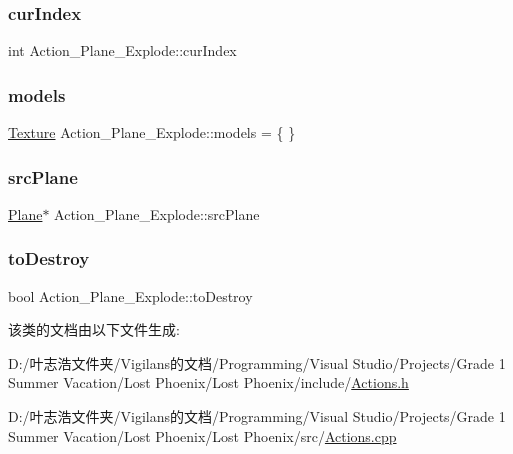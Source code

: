 \subsubsection{\texorpdfstring{cur\+Index}{curIndex}}
{\footnotesize\ttfamily int Action\+\_\+\+Plane\+\_\+\+Explode\+::cur\+Index}

\mbox{\label{class_action___plane___explode_ab37c2419e1e16a739b856de09df79909}} 
\subsubsection{\texorpdfstring{models}{models}}
{\footnotesize\ttfamily \hyperlink{struct_texture}{Texture} Action\+\_\+\+Plane\+\_\+\+Explode\+::models = \{ \}\hspace{0.3cm}{\ttfamily [static]}}

\mbox{\label{class_action___plane___explode_a98d4991b3266a6c7fc5ebbad4d41f136}} 
\subsubsection{\texorpdfstring{src\+Plane}{srcPlane}}
{\footnotesize\ttfamily \hyperlink{class_plane}{Plane}$\ast$ Action\+\_\+\+Plane\+\_\+\+Explode\+::src\+Plane}

\mbox{\label{class_action___plane___explode_a655f5cf52656c4ce16040d2310494029}} 
\subsubsection{\texorpdfstring{to\+Destroy}{toDestroy}}
{\footnotesize\ttfamily bool Action\+\_\+\+Plane\+\_\+\+Explode\+::to\+Destroy}



该类的文档由以下文件生成\+:\begin{DoxyCompactItemize}
\item 
D\+:/叶志浩文件夹/\+Vigilans的文档/\+Programming/\+Visual Studio/\+Projects/\+Grade 1 Summer Vacation/\+Lost Phoenix/\+Lost Phoenix/include/\hyperlink{_actions_8h}{Actions.\+h}\item 
D\+:/叶志浩文件夹/\+Vigilans的文档/\+Programming/\+Visual Studio/\+Projects/\+Grade 1 Summer Vacation/\+Lost Phoenix/\+Lost Phoenix/src/\hyperlink{_actions_8cpp}{Actions.\+cpp}\end{DoxyCompactItemize}
